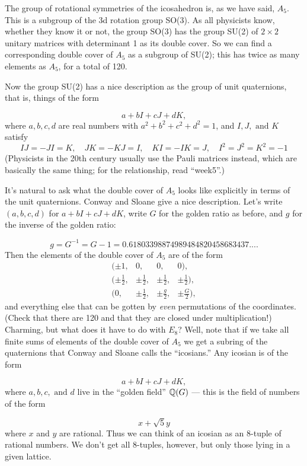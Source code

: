 The group of rotational symmetries of the icosahedron is, as we have said, $A_5$. This is a subgroup of the 3d rotation group SO(3). As all physicists know, whether they know it or not, the group SO(3) has the group SU(2) of $2 \times 2$ unitary matrices with determinant 1 as its double cover. So we can find a corresponding double cover of $A_5$ as a subgroup of SU(2); this has twice as many elements as $A_5$, for a total of 120.

Now the group SU(2) has a nice description as the group of unit quaternions, that is, things of the form

\[          a + bI + cJ + dK,\]
where $a,b,c,d$ are real numbers with $a^2 + b^2 + c^2 + d^2 = 1$, and $I,J,\text{ and }K$ satisfy
\[IJ = -JI = K, \quad	JK = -KJ = I, \quad   KI = -IK = J, \quad  I^2 = J^2 = K^2 = -1\]
(Physicists in the 20th century usually use the Pauli matrices instead, which are basically the same thing; for the relationship, read ``week5''.)

It's natural to ask what the double cover of $A_5$ looks like explicitly in terms of the unit quaternions. Conway and Sloane give a nice description. Let's write $(a,b,c,d)$ for $a + bI + cJ + dK$, write $G$ for the golden ratio as before, and $g$ for the inverse of the golden ratio:

\[ g = G^{-1} = G - 1 = 0.61803398874989484820458683437....\]
Then the elements of the double cover of $A_5$ are of the form
\[
\begin{array}{lccr}
(\pm 1, & 0, & 0, & 0),\\[1ex]
(\pm \frac{1}{2}, & \pm \frac{1}{2}, & \pm \frac{1}{2}, & \pm \frac{1}{2}),\\[1ex]
(    0, & \pm \frac{1}{2}, & \pm \frac{g}{2}, & \pm \frac{G}{2}),
\end{array}
\]
and everything else that can be gotten by \emph{even} permutations of the coordinates. (Check that there are 120 and that they are closed under multiplication!)
Charming, but what does it have to do with $E_8$? Well, note that if we take all finite sums of elements of the double cover of $A_5$ we get a subring of the quaternions that Conway and Sloane calls the ``icosians.'' Any icosian is of the form

\[           a + bI + cJ + dK,\]
where $a,b,c,\text{ and }d$ live in the ``golden field'' $\mathbb Q(G)$ --- this is the field of numbers of the form

\[            x + \sqrt{5} y\]
where $x$ and $y$ are rational. Thus we can think of an icosian as an 8-tuple of rational numbers. We don't get all 8-tuples, however, but only those lying in a given lattice.

